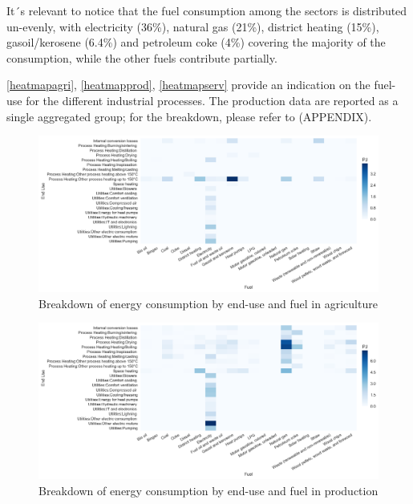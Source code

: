 \documentclass[review]{elsarticle}
\begin{document}
It´s relevant to notice that the fuel consumption among the sectors is distributed un-evenly, with electricity (36\%), natural gas (21\%), district heating (15\%), gasoil/kerosene (6.4\%) and petroleum coke (4\%) covering the majority of the consumption, while the other fuels contribute partially.

\autoref{heatmapagri}, \autoref{heatmapprod}, \autoref{heatmapserv} provide an indication on the fuel-use for the different industrial processes. The production data are reported as a single aggregated group; for the breakdown, please refer to (APPENDIX). 

\begin{figure}[H]
\centering
\includegraphics[width=\linewidth]{Img/dan_ind/heatmap_agri.png}
\caption{Breakdown of energy consumption by end-use and fuel in agriculture\cite{VM2015}}
\label{heatmapagri} 
\end{figure}

\begin{figure}[H]
\centering
\includegraphics[width=\linewidth]{Img/dan_ind/heatmap_prod.png}
\caption{Breakdown of energy consumption by end-use and fuel in production\cite{VM2015}}
\label{heatmapprod} 
\end{figure}
\end{document}
